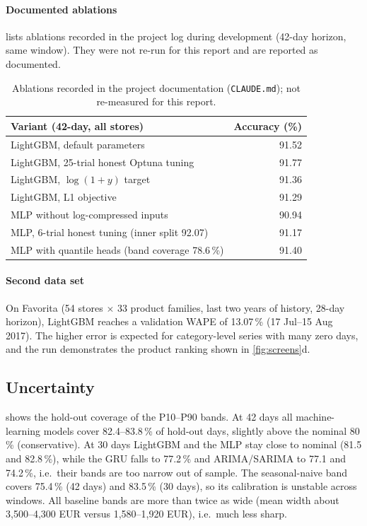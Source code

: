 \documentclass[conference]{IEEEtran}
\newcommand{\code}[1]{\texttt{\small #1}}
\begin{document}
\paragraph*{Documented ablations}
 lists ablations recorded in the project log during development (42-day horizon,
same window). They were not re-run for this report and are reported as documented.

\begin{table}[t]
\centering
\caption{Ablations recorded in the project documentation (\code{CLAUDE.md}); not re-measured for this report.}
\label{tab:ablation}
\scriptsize
\begin{tabular}{@{}lr@{}}
\toprule
Variant (42-day, all stores) & Accuracy (\%) \\
\midrule
LightGBM, default parameters & 91.52 \\
LightGBM, 25-trial honest Optuna tuning & 91.77 \\
LightGBM, $\log(1{+}y)$ target & 91.36 \\
LightGBM, L1 objective & 91.29 \\
MLP without log-compressed inputs & 90.94 \\
MLP, 6-trial honest tuning (inner split 92.07) & 91.17 \\
MLP with quantile heads (band coverage 78.6\,\%) & 91.40 \\
\bottomrule
\end{tabular}
\end{table}

\paragraph*{Second data set}
On Favorita (54 stores $\times$ 33 product families, last two years of history, 28-day horizon),
LightGBM reaches a validation WAPE of 13.07\,\% (17 Jul--15 Aug 2017). The higher error is expected
for category-level series with many zero days, and the run demonstrates the product ranking shown in
\cref{fig:screens}d.

\subsection{Uncertainty}\label{sec:results-uncertainty}
 shows the hold-out coverage of the P10--P90 bands. At 42 days all
machine-learning models cover 82.4--83.8\,\% of hold-out days, slightly above the nominal 80\,\%
(conservative). At 30 days LightGBM and the MLP stay close to nominal (81.5 and 82.8\,\%), while the
GRU falls to 77.2\,\% and ARIMA/SARIMA to 77.1 and 74.2\,\%, i.e.\ their bands are too narrow out of
sample. The seasonal-naive band covers 75.4\,\% (42 days) and 83.5\,\% (30 days), so its
calibration is unstable across windows. All baseline bands are more than twice as wide (mean width
about 3,500--4,300 EUR versus 1,580--1,920 EUR), i.e.\ much less sharp.
\end{document}
